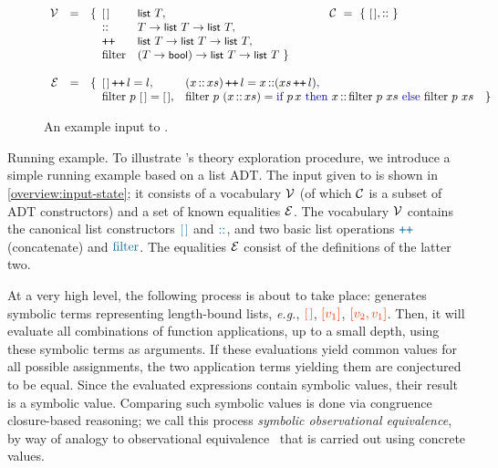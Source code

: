 \begin{figure}[t]
\[
\begin{array}{rll}
  \Vocab & = & \{ \begin{array}[t]{l@{\quad}l}
         \lnil       & \tlist~T, \\
         {\cons}     & T \to \tlist~T \to \tlist~T, \\
         {\concat}   & \tlist~T \to \tlist~T \to \tlist~T,  \\
         \tfilter & (T\to\tbool)\to\tlist~T\to\tlist~T~\}
         \end{array}
          
  \hspace{3em}
  \Constr ~=~ \{~\lnil, {\cons}~\} \\
         \\
  \Eqs    & = & \{\begin{array}[t]{l@{\quad}ll}
          \lnil \concat l = l, &
          (x\cons xs)\concat l = x\cons(xs\concat l), \\
          \tfilter~p~\lnil = \lnil,& 
          \tfilter~p~(x\cons xs) = \tif~p\,x~
          	\tthen~x\cons\tfilter~p~xs~
            \telse~\tfilter~p~xs &\}
          \end{array}
\end{array}
\]
\caption{An example input to \TheSy.}
\label{overview:input-state}
\end{figure}

\begin{paragraph}{Running example.}
To illustrate \TheSy's theory exploration procedure,
we introduce a simple running example based on a list ADT. The input given to \TheSy is shown in \autoref{overview:input-state};
it consists of a vocabulary $\mathcal{V}$ (of which $\mathcal{C}$ is a subset of ADT constructors) and a set of known equalities $\mathcal{E}$.
The vocabulary $\mathcal{V}$ contains the canonical list constructors $\clratom\lnil$ and $\clratom\cons$, and two basic list operations $\clratom\concat$ (concatenate) and $\clratom\tfilter$.
The equalities $\mathcal{E}$ consist of the definitions of the latter two.
\end{paragraph}

\medskip
At a very high level, the following process is about to take place:
\TheSy generates symbolic terms representing length-bound lists, \textit{e.g.}, $\clrsymex\lnil$, $\clrsymex[v_1]$, $\clrsymex[v_2,v_1]$.
Then, it will evaluate all combinations of function applications, up to a small depth, using these symbolic terms as arguments.
If these evaluations yield common values for all possible assignments, the two application terms yielding them are conjectured to be equal.
Since the evaluated expressions contain symbolic values, their result is a symbolic value. 
Comparing such symbolic values is done via congruence closure-based reasoning; we call this process \emph{symbolic observational equivalence}, by way of analogy to observational equivalence~\cite{CAV2103:Albarghouthi} that is carried out using concrete values.

